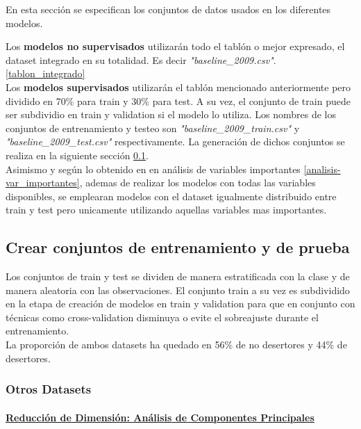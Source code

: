 
En esta sección se especifican los conjuntos de datos usados en los diferentes modelos.

Los \textbf{modelos no supervisados} utilizarán todo el tablón o mejor expresado, el dataset integrado en su totalidad. Es decir \textit{"baseline\_2009.csv"}. \ref{tablon_integrado} \\

Los \textbf{modelos supervisados} utilizarán el tablón mencionado anteriormente pero dividido en 70\% para train y 30\% para test. A su vez, el conjunto de train puede ser subdividio en train y validation si el modelo lo utiliza.
Los nombres de los conjuntos de entrenamiento y testeo son \textit{"baseline\_2009\_train.csv"} y \textit{"baseline\_2009\_test.csv"} respectivamente.
La generación de dichos conjuntos se realiza en la siguiente sección \ref{dataset_train_test}.\\
Asimismo y según lo obtenido en en análisis de variables importantes \ref{analisis-var_importantes}, ademas de realizar los modelos con todas las variables disponibles, se emplearan modelos con el dataset igualmente distribuido entre train y test pero unicamente utilizando aquellas variables mas importantes.

\subsection{Crear conjuntos de entrenamiento y de prueba}\label{dataset_train_test}

Los conjuntos de train y test se dividen de manera estratificada con la clase y de manera aleatoria con las observaciones. El conjunto train a su vez es subdividido en la etapa de creación de modelos en train y validation para que en conjunto con técnicas como cross-validation disminuya o evite el sobreajuste durante el entrenamiento.\\

La proporción de ambos datasets ha quedado en 56\% de no desertores y 44\% de desertores.



\subsubsection{Otros Datasets}

\paragraph{\textbf{\underline{Reducción de Dimensión: Análisis de Componentes Principales}}}\label{anuxe1lisis-de-componentes-principales}

